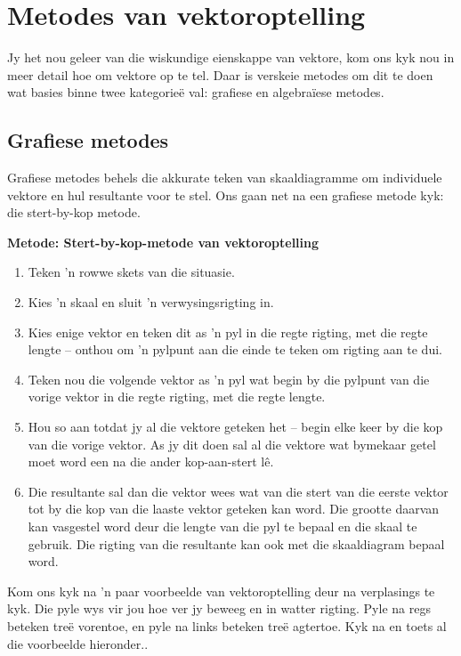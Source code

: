 \section{Metodes van vektoroptelling}

Jy het nou geleer van die wiskundige eienskappe van vektore, kom ons kyk nou in meer detail hoe om vektore op te tel. Daar is verskeie metodes om dit te doen wat basies binne twee kategorieë val: grafiese en algebraïese metodes.

\subsection*{Grafiese metodes}
Grafiese metodes behels die akkurate teken van skaaldiagramme om individuele vektore en hul resultante voor te stel. Ons gaan net na een grafiese metode kyk: die stert-by-kop metode.

\textbf{Metode: Stert-by-kop-metode van vektoroptelling}
\begin{enumerate}[noitemsep, label=\textbf{\arabic*}.]
\item{Teken  'n rowwe skets van die situasie.}
\item{Kies  'n skaal en sluit  'n verwysingsrigting in.}
\item{Kies enige vektor en teken dit as  'n pyl in die regte rigting, met die regte lengte -- onthou om  'n pylpunt aan die einde te teken om rigting aan te dui.}
\item{Teken nou die volgende vektor as  'n pyl wat begin by die pylpunt van die vorige vektor in die regte rigting, met die regte lengte.}
\item{Hou so aan totdat jy al die vektore geteken het -- begin elke keer by die kop van die vorige vektor. As jy dit doen sal al die vektore wat bymekaar getel moet word een na die ander kop-aan-stert l\^{e}.}
\item{Die resultante sal dan die vektor wees wat van die stert van die eerste vektor tot by die kop van die laaste vektor geteken kan word. Die grootte daarvan kan vasgestel word deur die lengte van die pyl te bepaal en die skaal te gebruik. Die rigting van die resultante kan ook met die skaaldiagram bepaal word. }
\end{enumerate} \par


Kom ons kyk na  'n paar voorbeelde van vektoroptelling deur na verplasings te kyk. Die pyle wys vir jou hoe ver jy beweeg en in watter rigting. Pyle na regs beteken treë vorentoe, en pyle na links beteken treë agtertoe. Kyk na en toets al die voorbeelde hieronder..\par 

